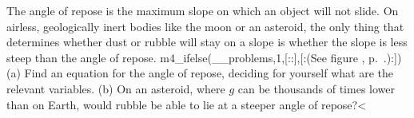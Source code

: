 The angle of repose is the maximum slope on which an
object will not slide. On airless, geologically inert bodies
like the moon or an asteroid, the only thing that determines
whether dust or rubble will stay on a slope is whether the
slope is less steep than the angle of repose.
m4_ifelse(__problems,1,[::],[:(See figure , p.~\pageref{fig:toutatis}.):]) \hwendpart
 (a) Find an
equation for the angle of repose, deciding for yourself what
are the relevant variables.\hwendpart
 (b) On an asteroid, where $g$
can be thousands of times lower than on Earth, would rubble
be able to lie at a steeper angle of repose?<%
